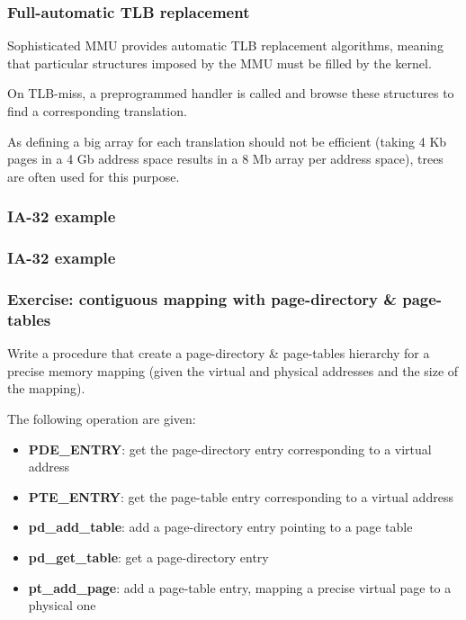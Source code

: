 
\begin{frame}
  \frametitle{Full-automatic TLB replacement}

  Sophisticated MMU provides automatic TLB replacement algorithms,
  meaning that particular structures imposed by the MMU must be filled
  by the kernel.

  \-

  On TLB-miss, a preprogrammed handler is called and browse these
  structures to find a corresponding translation.

  \-

  As defining a big array for each translation should not be efficient
  (taking 4 Kb pages in a 4 Gb address space results in a 8 Mb array
  per address space), trees are often used for this purpose.

\end{frame}


\begin{frame}
  \frametitle{IA-32 example}

  \begin{center}
  \end{center}

\end{frame}


\begin{frame}
  \frametitle{IA-32 example}

  \begin{center}
  \end{center}

\end{frame}


\begin{frame}
  \frametitle{Exercise: contiguous mapping with page-directory \&
  page-tables}

  Write a procedure that create a page-directory \& page-tables
  hierarchy for a precise memory mapping (given the virtual and
  physical addresses and the size of the mapping).

  \-

  The following operation are given:

  \begin{itemize}
  \item
    \textbf{PDE\_ENTRY}: get the page-directory entry corresponding to
    a virtual address
  \item
    \textbf{PTE\_ENTRY}: get the page-table entry corresponding to
    a virtual address
  \item
    \textbf{pd\_add\_table}: add a page-directory entry pointing to a
    page table
  \item
    \textbf{pd\_get\_table}: get a page-directory entry
  \item
    \textbf{pt\_add\_page}: add a page-table entry, mapping a precise
    virtual page to a physical one
  \end{itemize}

\end{frame}

